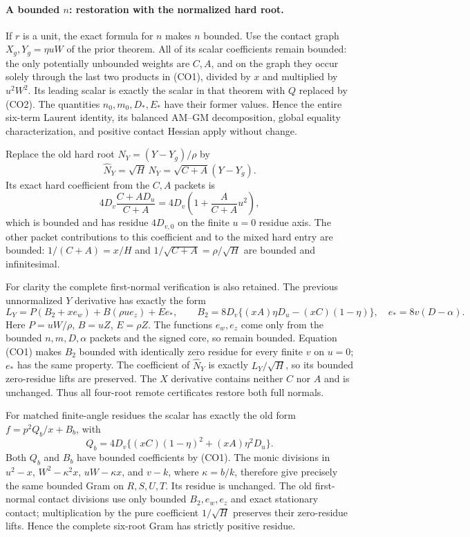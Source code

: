 \paragraph{A bounded $n$: restoration with the normalized hard root.}
If $r$ is a unit, the exact formula for $n$ makes $n$ bounded.  Use the
contact graph $X_g,Y_g=\eta uW$ of the prior theorem.  All of its scalar
coefficients remain bounded: the only potentially unbounded weights
are $C,A$, and on the graph they occur solely through the last two
products in (CO1), divided by $x$ and multiplied by $u^2W^2$.
Its leading scalar is exactly the scalar in that theorem with $Q$
replaced by (CO2).  The quantities $n_0,m_0,D_*,E_*$ have their former
values.  Hence the entire six-term Laurent identity, its balanced
AM--GM decomposition, global equality characterization, and positive
contact Hessian apply without change.

Replace the old hard root $N_Y=(Y-Y_g)/\rho$ by
\[
        \widehat N_Y=\sqrt H\,N_Y=\sqrt{C+A}(Y-Y_g).
                                                               \tag{CO3}
\]
Its exact hard coefficient from the $C,A$ packets is
\[
             4D_v\frac{C+AD_u}{C+A}
       =4D_v\left(1+\frac{A}{C+A}u^2\right),             \tag{CO4}
\]
which is bounded and has residue $4D_{v,0}$ on the finite $u=0$
residue axis.  The other packet contributions to this coefficient
and to the mixed hard entry are bounded: $1/(C+A)=x/H$ and
$1/\sqrt{C+A}=\rho/\sqrt H$ are bounded and infinitesimal.

For clarity the complete first-normal verification is also retained.
The previous unnormalized $Y$ derivative has exactly the form
\[
 L_Y=P(B_2+xe_w)+B(\rho u e_z)+E e_*,\qquad
 B_2=8D_v\{(xA)\eta D_u-(xC)(1-\eta)\},
 \quad e_*=8v(D-\alpha).                                \tag{CO5}
\]
Here $P=uW/\rho$, $B=uZ$, $E=\rho Z$.  The functions $e_w,e_z$
come only from the bounded $n,m,D,\alpha$ packets and the signed
core, so remain bounded.  Equation (CO1) makes $B_2$ bounded with
identically zero residue for every finite $v$ on $u=0$; $e_*$ has
the same property.  The coefficient of $\widehat N_Y$ is exactly
$L_Y/\sqrt H$, so its bounded zero-residue lifts are preserved.
The $X$ derivative contains neither $C$ nor $A$ and is unchanged.
Thus all four-root remote certificates restore both full normals.

For matched finite-angle residues the scalar has exactly the old
form $f=p^2Q_b/x+B_b$, with
\[
 Q_b=4D_v\{(xC)(1-\eta)^2+(xA)\eta^2D_u\}.
\]
Both $Q_b$ and $B_b$ have bounded coefficients by (CO1).  The monic
divisions in $u^2-x$, $W^2-\kappa^2x$, $uW-\kappa x$, and $v-k$,
where $\kappa=b/k$, therefore give precisely the same bounded Gram
on $R,S,U,T$.  Its residue is unchanged.  The old first-normal
contact divisions use only bounded $B_2,e_w,e_z$ and exact stationary
contact; multiplication by the pure coefficient $1/\sqrt H$
preserves their zero-residue lifts.  Hence the complete six-root
Gram has strictly positive residue.

